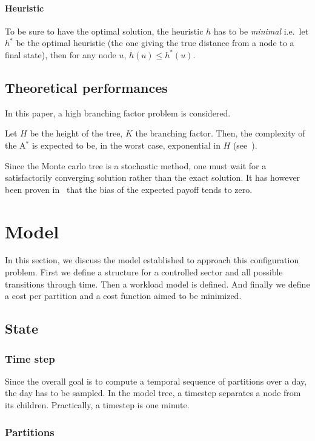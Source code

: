 \documentclass[oneside,twocolumn]{article}
\begin{document}
\paragraph{Heuristic}
To be sure to have the optimal solution, the heuristic \(h\) has to be
\emph{minimal} i.e.\ let \(h^*\) be the optimal heuristic (the one giving the
true distance from a node to a final state), then for any node \(u\), \(h(u)
\leq h^*(u)\).


\subsection{Theoretical performances}\label{ssec:theoretical_performances}
In this paper, a high branching factor problem is considered.

Let \(H\) be the height of the tree, \(K\) the branching factor.
Then, the complexity of the A\(^*\) is expected to be, in the worst case,
exponential in \(H\) (see~\cite{alliotschiex2002ia&it}).

Since the Monte carlo tree is a stochastic method, one must wait for a
satisfactorily converging solution rather than the exact solution. It has
however been proven in~\cite{kocsis2006bandit} that the bias of the expected
payoff tends to zero.


\section{Model}

In this section, we discuss the model established to approach this configuration
problem. First we define a structure for a controlled sector and all possible
transitions through time. Then a workload model is defined. And finally we
define a cost per partition and a cost function aimed to be minimized.

\subsection{State}

\subsubsection{Time step}
Since the overall goal is to compute a temporal sequence of partitions over a
day, the day has to be sampled. In the model tree, a timestep separates a node
from its children. Practically, a timestep is one minute.

\subsubsection{Partitions}\label{ssec:partitions}
\end{document}
